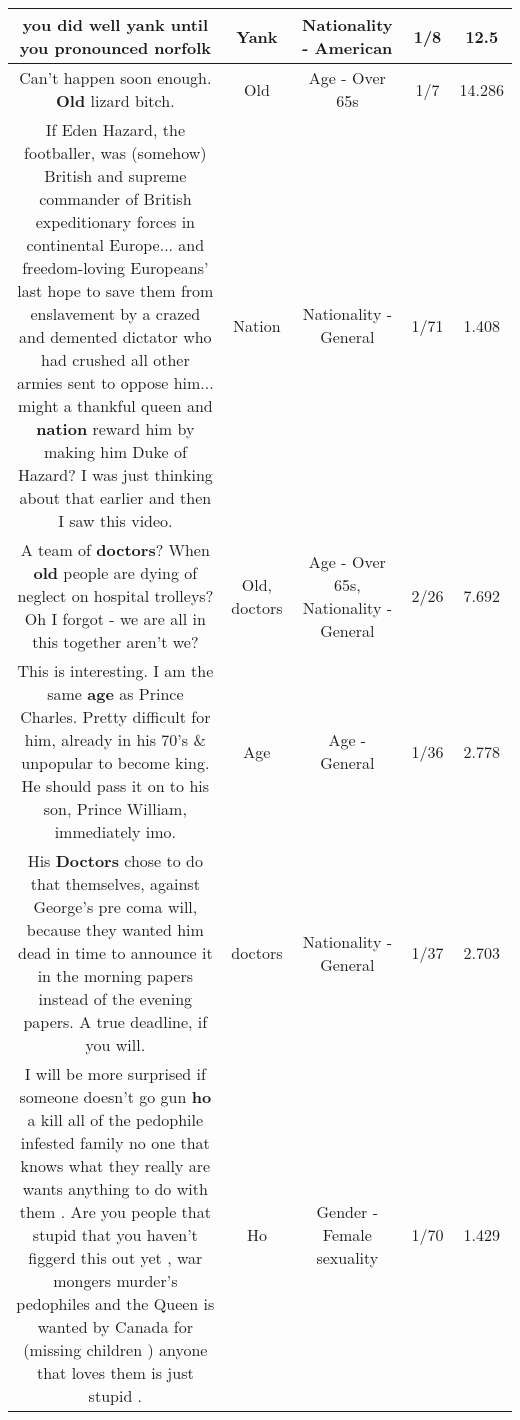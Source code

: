 \documentclass[11pt]{article}
\newlength\mylength
\begin{document}
\begin{center}
\begin{longtable}{|C{.65\mylength}|C{.30\mylength}|C{.12\mylength}|C{.12\mylength}|C{.12\mylength}|}
  \small you did well \textbf{yank} until you pronounced norfolk\normalsize   & Yank & Nationality - American & 1/8 & 12.5 \\  \hline
  \small Can't happen soon enough.  \textbf{Old} lizard bitch.\normalsize   & Old & Age - Over 65s & 1/7 & 14.286 \\  \hline
  \small If Eden Hazard, the footballer, was (somehow) British and supreme commander of British expeditionary forces in continental Europe... and freedom-loving Europeans' last hope to save them from enslavement by a crazed and demented dictator who had crushed all other armies sent to oppose him... might a thankful queen and \textbf{nation} reward him by making him Duke of Hazard? I was just thinking about that earlier and then I saw this video.\normalsize   & Nation & Nationality - General & 1/71 & 1.408 \\  \hline
  \small A team of \textbf{doctors}?  When \textbf{old} people are dying of neglect on hospital trolleys?  Oh I forgot - we are all in this together aren't we?\normalsize   & Old, doctors & Age - Over 65s, Nationality - General & 2/26 & 7.692 \\  \hline
  \small This is interesting. I am the same \textbf{age} as Prince Charles. Pretty difficult for him, already in his 70's \& unpopular to become king. He should pass it on to his son, Prince William, immediately imo.\normalsize   & Age & Age - General & 1/36 & 2.778 \\  \hline
  \small His \textbf{Doctors} chose to do that themselves, against George's pre coma will, because they wanted him dead in time to announce it in the morning papers instead of the evening papers.  A true deadline, if you will.\normalsize   & doctors & Nationality - General & 1/37 & 2.703 \\  \hline
  \small I will be more surprised if someone doesn't go gun \textbf{ho} a kill all of the pedophile infested family no one that knows what they really are wants anything to do with them  . Are you people that stupid that you haven't figgerd this out yet , war mongers murder's pedophiles and the Queen is wanted by Canada for (missing children ) anyone that loves them is just stupid .\normalsize   & Ho & Gender - Female sexuality & 1/70 & 1.429 \\  \hline

\end{longtable}
\end{center}
\end{document}
